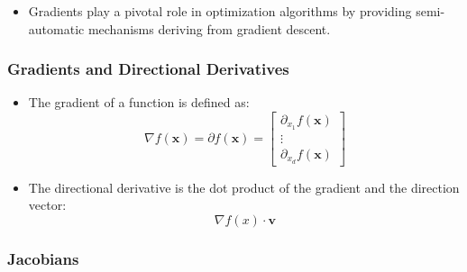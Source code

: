 \documentclass{article}
\newcommand{\mbf}[1]{\mathbf{#1}}
\begin{document}
\begin{itemize}
    \item Gradients play a pivotal role in optimization algorithms by providing semi-automatic mechanisms deriving from gradient descent. 
\end{itemize}

\subsubsection{Gradients and Directional Derivatives}

\begin{itemize}
    \item The gradient of a function is defined as:
    \[
    \nabla f(\mathbf{x}) = \partial f(\mathbf{x}) =
    \begin{bmatrix}
    \partial_{x_1} f(\mathbf{x}) \\
    \vdots \\
    \partial_{x_d} f(\mathbf{x})
    \end{bmatrix}
    \]
    \item The directional derivative is the dot product of the gradient and the direction vector:
    \[\nabla f(x) \cdot \mbf{v}\]
\end{itemize}

\subsubsection{Jacobians}
\end{document}
